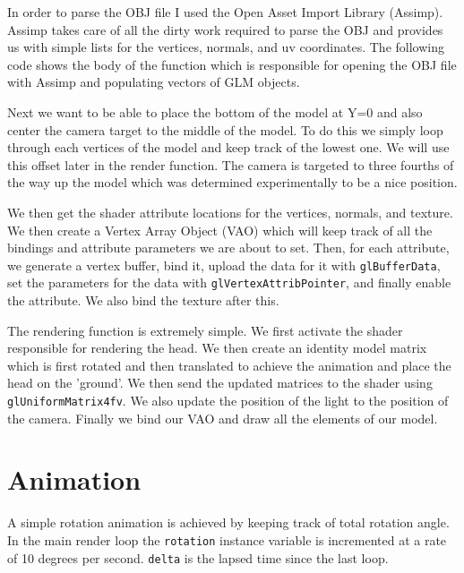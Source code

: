 \documentclass{article}
\newcommand{\mylisting}[3]{
    
}
\begin{document}
In order to parse the OBJ file I used the Open Asset Import Library (Assimp).
Assimp takes care of all the dirty work required to parse the OBJ and provides
us with simple lists for the vertices, normals, and uv coordinates. The
following code shows the body of the function which is responsible for opening
the OBJ file with Assimp and populating vectors of GLM objects.

\mylisting{../code/objloader.cpp}{23-65}{OBJ Loading}

\newpage
Next we want to be able to place the bottom of the model at Y=0 and also
center the camera target to the middle of the model. To do this we simply loop through
each vertices of the model and keep track of the lowest one. We will use this offset later
in the render function. The camera is targeted to three fourths of the way up the model which
was determined experimentally to be a nice position.

\mylisting{../code/head.cpp}{32-42}{Calculate model offset}

We then get the shader attribute locations for the vertices, normals, and
texture.  We then create a Vertex Array Object (VAO) which will keep track of
all the bindings and attribute parameters we are about to set. Then, for each
attribute, we generate a vertex buffer, bind it, upload the data for it with
\texttt{glBufferData}, set the parameters for the data with
\texttt{glVertexAttribPointer}, and finally enable the attribute. We also bind
the texture after this.

\mylisting{../code/head.cpp}{46-75}{Setup Bind and Load Buffers}

The rendering function is extremely simple. We first activate the shader
responsible for rendering the head. We then create an identity model matrix
which is first rotated and then translated to achieve the animation and place
the head on the 'ground'. We then send the updated matrices to the shader using
\texttt{glUniformMatrix4fv}. We also update the position of the light to the
position of the camera. Finally we bind our VAO and draw all the elements of
our model.

\mylisting{../code/head.cpp}{80-96}{Render Function}

\section*{Animation}

A simple rotation animation is achieved by keeping track of total rotation
angle. In the main render loop the \texttt{rotation} instance variable is
incremented at a rate of 10 degrees per second. \texttt{delta} is the lapsed
time since the last loop.
\end{document}
